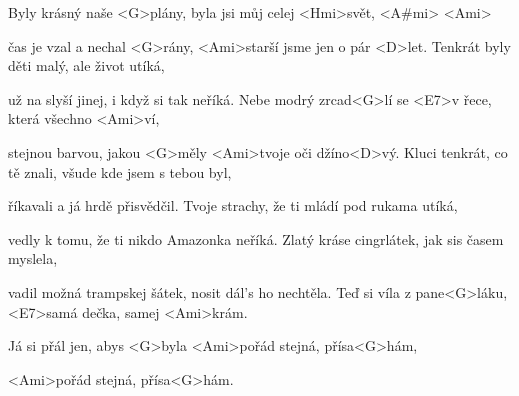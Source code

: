 
\zs
Byly krásný naše <G>plány,
byla jsi můj celej <Hmi>svět, <A#mi> <Ami>

čas je vzal a nechal <G>rány,
<Ami>starší jsme jen o pár <D>let.
\ks
\zs
Tenkrát byly děti malý, ale život utíká,

už na  slyší jinej, i když si tak neříká.
\ks
\zr
Nebe modrý zrcad<G>lí se <E7>v řece, která všechno <Ami>ví,

stejnou barvou, jakou <G>měly <Ami>tvoje oči džíno<D>vý.
\kr
\zs
Kluci tenkrát, co tě znali, všude kde jsem s tebou byl,

 říkavali a já hrdě přisvědčil.
\ks
\zs
Tvoje strachy, že ti mládí pod rukama utíká,

vedly k tomu, že ti nikdo Amazonka neříká.
\ks
\zr \kr
\zs
Zlatý kráse cingrlátek,
jak sis časem myslela,

vadil možná trampskej šátek,
nosit dál's ho nechtěla.
\ks
\zs
Teď si víla z pane<G>láku, <E7>samá dečka, samej <Ami>krám.

Já si přál jen, abys <G>byla <Ami>pořád stejná, přísa<G>hám,

<Ami>pořád stejná, přísa<G>hám.
\ks

\kp
